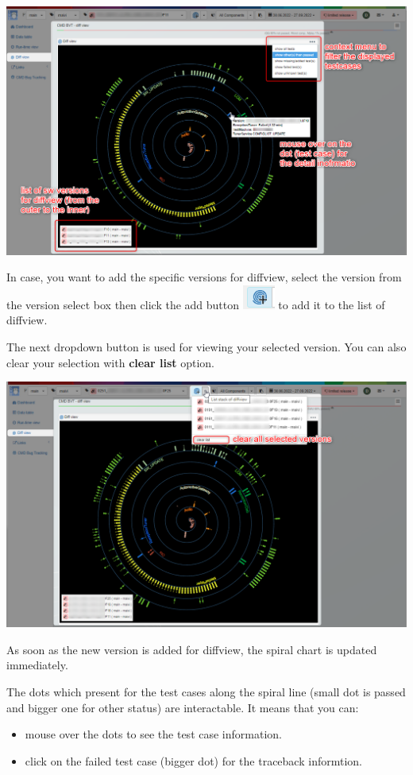 \includegraphics[width=1\linewidth]{./pictures/diffview/default_detail.png}

In case, you want to add the specific versions for diffview, select the version
from the version select box then click the add button 
\includegraphics{./pictures/diffview/add_button.png} to add it to the list of 
diffview. 

The next dropdown button is used for viewing your selected version.
You can also clear your selection with \textbf{clear list} option.

\includegraphics[width=1\linewidth]{./pictures/diffview/selected_version.png}

As soon as the new version is added for diffview, the spiral chart is updated 
immediately.

The dots which present for the test cases along the spiral line (small dot is 
passed and bigger one for other status) are interactable. It means that you can:
\begin{itemize}
   \item mouse over the dots to see the test case information.
   \item click on the failed test case (bigger dot) for the traceback informtion.
\end{itemize}

